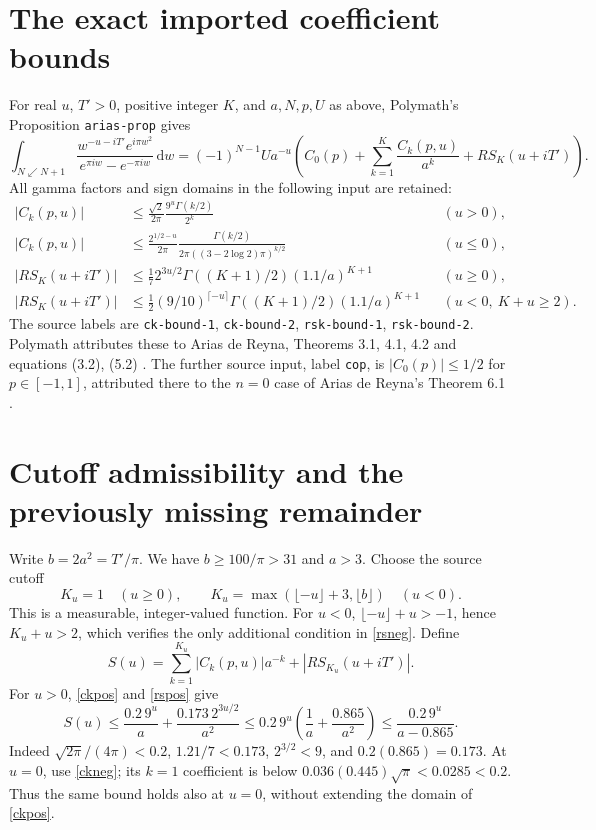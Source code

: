 \documentclass[11pt]{article}
\newcommand{\dd}{\,\mathrm d}
\begin{document}
\section{The exact imported coefficient bounds}

For real $u$, $T'>0$, positive integer $K$, and $a,N,p,U$ as above,
Polymath's Proposition \texttt{arias-prop} gives
\begin{equation}\label{RSexp}
 \int_{N\swarrow N+1}\frac{w^{-u-iT'}e^{i\pi w^2}}
 {e^{\pi iw}-e^{-\pi iw}}\dd w
 =(-1)^{N-1}Ua^{-u}
 \left(C_0(p)+\sum_{k=1}^K\frac{C_k(p,u)}{a^k}+RS_K(u+iT')\right).
\end{equation}
All gamma factors and sign domains in the following input are retained:
\begin{align}
 |C_k(p,u)|&\le\frac{\sqrt2}{2\pi}
                      \frac{9^u\Gamma(k/2)}{2^k} &&(u>0),\label{ckpos}\\
 |C_k(p,u)|&\le\frac{2^{1/2-u}}{2\pi}
       \frac{\Gamma(k/2)}{2\pi((3-2\log2)\pi)^{k/2}} &&(u\le0),\label{ckneg}\\
 |RS_K(u+iT')|&\le\frac17 2^{3u/2}
                         \Gamma((K+1)/2)(1.1/a)^{K+1} &&(u\ge0),\label{rspos}\\
 |RS_K(u+iT')|&\le\frac12(9/10)^{\lceil-u\rceil}
                   \Gamma((K+1)/2)(1.1/a)^{K+1}
                          &&(u<0,\ K+u\ge2).\label{rsneg}
\end{align}
The source labels are \texttt{ck-bound-1}, \texttt{ck-bound-2},
\texttt{rsk-bound-1}, \texttt{rsk-bound-2}. Polymath attributes these
to Arias de Reyna, Theorems 3.1, 4.1, 4.2 and equations (3.2), (5.2)
\cite{arias}. The further source input, label \texttt{cop}, is
$|C_0(p)|\le1/2$ for $p\in[-1,1]$, attributed there to the $n=0$
case of Arias de Reyna's Theorem 6.1 \cite{polymath,arias}.

\section{Cutoff admissibility and the previously missing remainder}

Write $b=2a^2=T'/\pi$. We have $b\ge100/\pi>31$ and $a>3$.
Choose the source cutoff
\[
 K_u=1\quad(u\ge0),\qquad
 K_u=\max(\lfloor-u\rfloor+3,\lfloor b\rfloor)\quad(u<0).
\]
This is a measurable, integer-valued function. For $u<0$,
$\lfloor-u\rfloor+u>-1$, hence $K_u+u>2$, which verifies
the only additional condition in \eqref{rsneg}. Define
\[
 S(u)=\sum_{k=1}^{K_u}|C_k(p,u)|a^{-k}+|RS_{K_u}(u+iT')|.
\]
For $u>0$, \eqref{ckpos} and \eqref{rspos} give
\[
 S(u)\le\frac{0.2\,9^u}{a}+\frac{0.173\,2^{3u/2}}{a^2}
 \le0.2\,9^u\left(\frac1a+\frac{0.865}{a^2}\right)
 \le\frac{0.2\,9^u}{a-0.865}.
\]
Indeed $\sqrt{2\pi}/(4\pi)<0.2$, $1.21/7<0.173$,
$2^{3/2}<9$, and $0.2(0.865)=0.173$.
At $u=0$, use \eqref{ckneg}; its $k=1$ coefficient is below
$0.036(0.445)\sqrt\pi<0.0285<0.2$. Thus the same bound holds
also at $u=0$, without extending the domain of \eqref{ckpos}.
\end{document}
